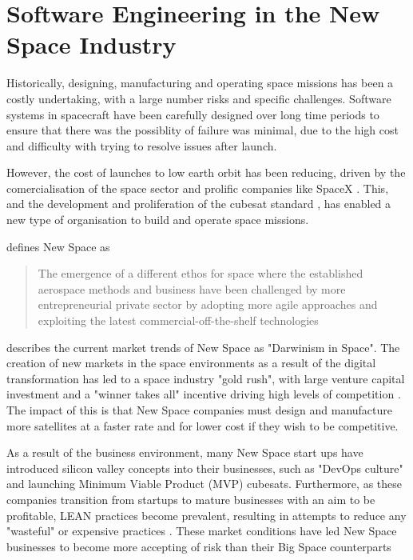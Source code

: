 \documentclass[../report.tex]{subfiles}
\begin{document}
\section{Software Engineering in the New Space Industry}

Historically, designing, manufacturing and operating space missions has been a
costly undertaking, with a large number risks and specific challenges. Software
systems in spacecraft have been carefully designed over long time periods to
ensure that there was the possiblity of failure was minimal, due to the high
cost and difficulty with trying to resolve issues after launch.

However, the cost of launches to low earth orbit has been reducing, driven by
the comercialisation of the space sector and prolific companies like SpaceX
\citep{Denis_2020}. This, and the development and proliferation of the cubesat
standard \citep{CubesatDesignSpec}, has enabled a new type of organisation to
build and operate space missions.


\citet{Sweeting_2018} defines New Space as
\begin{quote}
    The emergence of a different ethos for space where the established
    aerospace methods and business have been challenged by more entrepreneurial
    private sector by adopting more agile approaches and exploiting the latest
    commercial-off-the-shelf technologies
\end{quote}

\citet{Denis_2020} describes the current market trends of New Space as
"Darwinism in Space". The creation of new markets in the space environments as
a result of the digital transformation has led to a space industry "gold rush",
with large venture capital investment and a "winner takes all" incentive
driving high levels of competition \citep{Denis_2020}. The impact of this is
that New Space companies must design and manufacture more satellites at a
faster rate and for lower cost if they wish to be competitive.

As a result of the business environment, many New Space start ups have
introduced silicon valley concepts into their businesses, such as "DevOps
culture" and launching Minimum Viable Product (MVP) cubesats. Furthermore, as
these companies transition from startups to mature businesses with an aim to be
profitable, LEAN practices become prevalent, resulting in attempts to reduce
any "wasteful" or expensive practices \citep{Denis_2020}. These market
conditions have led New Space businesses to become more accepting of risk than
their Big Space counterparts \citep{Cratere_2024}
\end{document}
